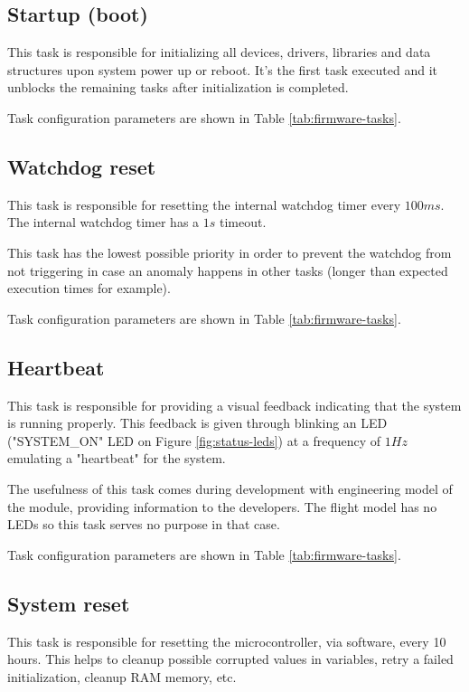 \subsection{Startup (boot)}

This task is responsible for initializing all devices, drivers, libraries and data structures upon system power up or reboot.
It's the first task executed and it unblocks the remaining tasks after initialization is completed.

Task configuration parameters are shown in Table \ref{tab:firmware-tasks}.

\subsection{Watchdog reset}

This task is responsible for resetting the internal watchdog timer every \(100 ms\).
The internal watchdog timer has a \(1 s\) timeout.

This task has the lowest possible priority in order to prevent the watchdog from not triggering in case an anomaly happens in other tasks (longer than expected execution times for example).

Task configuration parameters are shown in Table \ref{tab:firmware-tasks}.

\subsection{Heartbeat}

This task is responsible for providing a visual feedback indicating that the system is running properly.
This feedback is given through blinking an LED ("SYSTEM\_ON" LED on Figure \ref{fig:status-leds}) at a frequency of \(1 Hz\) emulating a "heartbeat" for the system.

The usefulness of this task comes during development with engineering model of the module, providing information to the developers.
The flight model has no LEDs so this task serves no purpose in that case. 

Task configuration parameters are shown in Table \ref{tab:firmware-tasks}.

\subsection{System reset}

This task is responsible for resetting the microcontroller, via software, every 10 hours.
This helps to cleanup possible corrupted values in variables, retry a failed initialization, cleanup RAM memory, etc.

